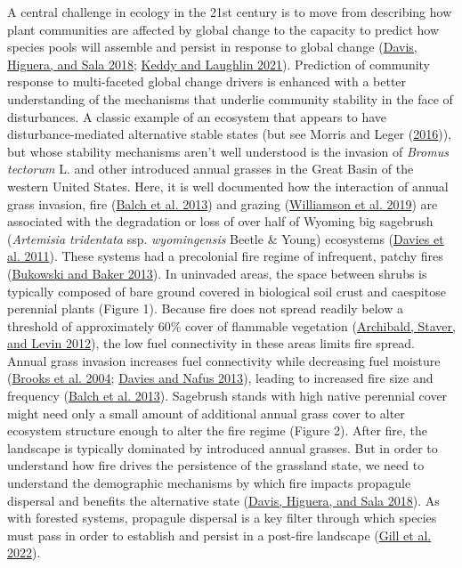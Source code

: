 \documentclass[
  12pt,
]{article}
\begin{document}
A central challenge in ecology in the 21st century is to move from
describing how plant communities are affected by global change to the
capacity to predict how species pools will assemble and persist in
response to global change (\protect\hyperlink{ref-Davis2018}{Davis,
Higuera, and Sala 2018}; \protect\hyperlink{ref-Keddy2021}{Keddy and
Laughlin 2021}). Prediction of community response to multi-faceted
global change drivers is enhanced with a better understanding of the
mechanisms that underlie community stability in the face of
disturbances. A classic example of an ecosystem that appears to have
disturbance-mediated alternative stable states (but see Morris and Leger
(\protect\hyperlink{ref-Morris2016}{2016})), but whose stability
mechanisms aren't well understood is the invasion of \emph{Bromus
tectorum} L. and other introduced annual grasses in the Great Basin of
the western United States. Here, it is well documented how the
interaction of annual grass invasion, fire
(\protect\hyperlink{ref-Balch2013}{Balch et al. 2013}) and grazing
(\protect\hyperlink{ref-Williamson2019}{Williamson et al. 2019}) are
associated with the degradation or loss of over half of Wyoming big
sagebrush (\emph{Artemisia tridentata} ssp. \emph{wyomingensis} Beetle
\& Young) ecosystems (\protect\hyperlink{ref-Davies2011}{Davies et al.
2011}). These systems had a precolonial fire regime of infrequent,
patchy fires (\protect\hyperlink{ref-Bukowski2013}{Bukowski and Baker
2013}). In uninvaded areas, the space between shrubs is typically
composed of bare ground covered in biological soil crust and caespitose
perennial plants (Figure 1). Because fire does not spread readily below
a threshold of approximately 60\% cover of flammable vegetation
(\protect\hyperlink{ref-Archibald2012}{Archibald, Staver, and Levin
2012}), the low fuel connectivity in these areas limits fire spread.
Annual grass invasion increases fuel connectivity while decreasing fuel
moisture (\protect\hyperlink{ref-Brooks2004}{Brooks et al. 2004};
\protect\hyperlink{ref-Davies2013}{Davies and Nafus 2013}), leading to
increased fire size and frequency
(\protect\hyperlink{ref-Balch2013}{Balch et al. 2013}). Sagebrush stands
with high native perennial cover might need only a small amount of
additional annual grass cover to alter ecosystem structure enough to
alter the fire regime (Figure 2). After fire, the landscape is typically
dominated by introduced annual grasses. But in order to understand how
fire drives the persistence of the grassland state, we need to
understand the demographic mechanisms by which fire impacts propagule
dispersal and benefits the alternative state
(\protect\hyperlink{ref-Davis2018}{Davis, Higuera, and Sala 2018}). As
with forested systems, propagule dispersal is a key filter through which
species must pass in order to establish and persist in a post-fire
landscape (\protect\hyperlink{ref-Gill2022}{Gill et al. 2022}).
\end{document}
